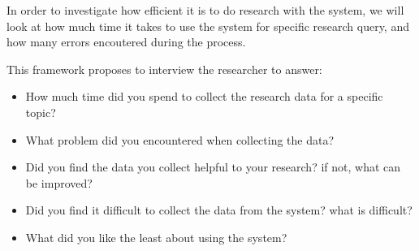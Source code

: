 In order to investigate how efficient it is to do research with the system, we will look at how much time it takes to use the system for specific research query, and how many errors encoutered during the process.

This framework proposes to interview the researcher to answer:
\begin{itemize}
\item How much time did you spend to collect the research data for a specific topic?
\item What problem did you encountered when collecting the data?
\item Did you find the data you collect helpful to your research? if not, what can be improved?
\item Did you find it difficult to collect the data from the system? what is difficult?
\item What did you like the least about using the system?
\end{itemize}
